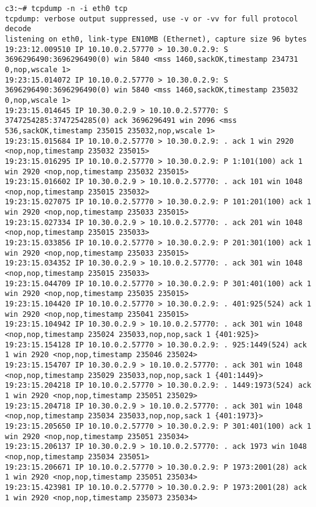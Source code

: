 \documentclass[a4paper,12pt]{article}
\begin{document}
\begin{lstlisting}
c3:~# tcpdump -n -i eth0 tcp
tcpdump: verbose output suppressed, use -v or -vv for full protocol decode
listening on eth0, link-type EN10MB (Ethernet), capture size 96 bytes
19:23:12.009510 IP 10.10.0.2.57770 > 10.30.0.2.9: S 3696296490:3696296490(0) win 5840 <mss 1460,sackOK,timestamp 234731 0,nop,wscale 1>
19:23:15.014072 IP 10.10.0.2.57770 > 10.30.0.2.9: S 3696296490:3696296490(0) win 5840 <mss 1460,sackOK,timestamp 235032 0,nop,wscale 1>
19:23:15.014645 IP 10.30.0.2.9 > 10.10.0.2.57770: S 3747254285:3747254285(0) ack 3696296491 win 2096 <mss 536,sackOK,timestamp 235015 235032,nop,wscale 1>
19:23:15.015684 IP 10.10.0.2.57770 > 10.30.0.2.9: . ack 1 win 2920 <nop,nop,timestamp 235032 235015>
19:23:15.016295 IP 10.10.0.2.57770 > 10.30.0.2.9: P 1:101(100) ack 1 win 2920 <nop,nop,timestamp 235032 235015>
19:23:15.016602 IP 10.30.0.2.9 > 10.10.0.2.57770: . ack 101 win 1048 <nop,nop,timestamp 235015 235032>
19:23:15.027075 IP 10.10.0.2.57770 > 10.30.0.2.9: P 101:201(100) ack 1 win 2920 <nop,nop,timestamp 235033 235015>
19:23:15.027334 IP 10.30.0.2.9 > 10.10.0.2.57770: . ack 201 win 1048 <nop,nop,timestamp 235015 235033>
19:23:15.033856 IP 10.10.0.2.57770 > 10.30.0.2.9: P 201:301(100) ack 1 win 2920 <nop,nop,timestamp 235033 235015>
19:23:15.034352 IP 10.30.0.2.9 > 10.10.0.2.57770: . ack 301 win 1048 <nop,nop,timestamp 235015 235033>
19:23:15.044709 IP 10.10.0.2.57770 > 10.30.0.2.9: P 301:401(100) ack 1 win 2920 <nop,nop,timestamp 235035 235015>
19:23:15.104420 IP 10.10.0.2.57770 > 10.30.0.2.9: . 401:925(524) ack 1 win 2920 <nop,nop,timestamp 235041 235015>
19:23:15.104942 IP 10.30.0.2.9 > 10.10.0.2.57770: . ack 301 win 1048 <nop,nop,timestamp 235024 235033,nop,nop,sack 1 {401:925}>
19:23:15.154128 IP 10.10.0.2.57770 > 10.30.0.2.9: . 925:1449(524) ack 1 win 2920 <nop,nop,timestamp 235046 235024>
19:23:15.154707 IP 10.30.0.2.9 > 10.10.0.2.57770: . ack 301 win 1048 <nop,nop,timestamp 235029 235033,nop,nop,sack 1 {401:1449}>
19:23:15.204218 IP 10.10.0.2.57770 > 10.30.0.2.9: . 1449:1973(524) ack 1 win 2920 <nop,nop,timestamp 235051 235029>
19:23:15.204718 IP 10.30.0.2.9 > 10.10.0.2.57770: . ack 301 win 1048 <nop,nop,timestamp 235034 235033,nop,nop,sack 1 {401:1973}>
19:23:15.205650 IP 10.10.0.2.57770 > 10.30.0.2.9: P 301:401(100) ack 1 win 2920 <nop,nop,timestamp 235051 235034>
19:23:15.206137 IP 10.30.0.2.9 > 10.10.0.2.57770: . ack 1973 win 1048 <nop,nop,timestamp 235034 235051>
19:23:15.206671 IP 10.10.0.2.57770 > 10.30.0.2.9: P 1973:2001(28) ack 1 win 2920 <nop,nop,timestamp 235051 235034>
19:23:15.423981 IP 10.10.0.2.57770 > 10.30.0.2.9: P 1973:2001(28) ack 1 win 2920 <nop,nop,timestamp 235073 235034>

\end{lstlisting}
\end{document}
